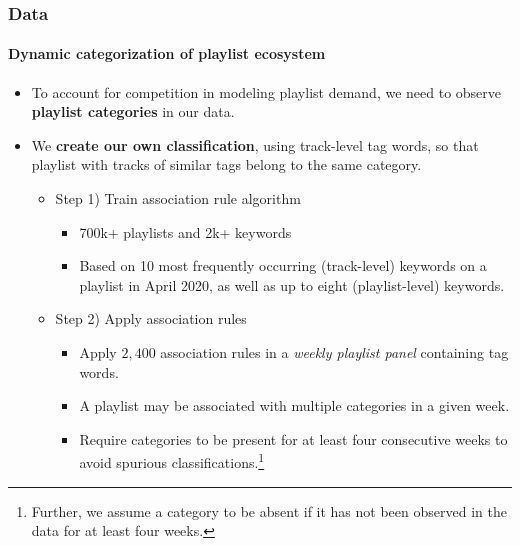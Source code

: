 \documentclass[8pt]{beamer}
\begin{document}
\begin{frame}

    \frametitle{Data}
    \framesubtitle{Dynamic categorization of playlist ecosystem}
   
   \begin{itemize}
   
       \item To account for competition in modeling playlist demand, we need to observe \textbf{playlist categories} in our data.
       \vspace{.2cm}
       \item We \textbf{create our own classification}, using track-level tag words, so that playlist with tracks of similar tags belong to the same category.
       \begin{itemize}
          \item[$\rightarrow$] Step 1) Train association rule algorithm \citep{hastie_09}
               \begin{itemize}
                   \item 700k+ playlists and 2k+ keywords
                   \item Based on 10 most frequently occurring (track-level) keywords on a playlist in April 2020, as well as up to eight (playlist-level) keywords.
               \end{itemize}

          \item[$\rightarrow$] Step 2) Apply association rules
          \begin{itemize}
            \item Apply $2,400$ association rules in a \textit{weekly playlist panel} containing tag words.
            \item A playlist may be associated with multiple categories in a given week.
            \item Require categories to be present for at least four consecutive weeks to avoid spurious classifications.\footnote{Further, we assume a category to be absent if it has not been observed in the data for at least four weeks.}
            

\end{itemize}
\end{itemize}
\end{itemize}
\end{frame}
\end{document}
